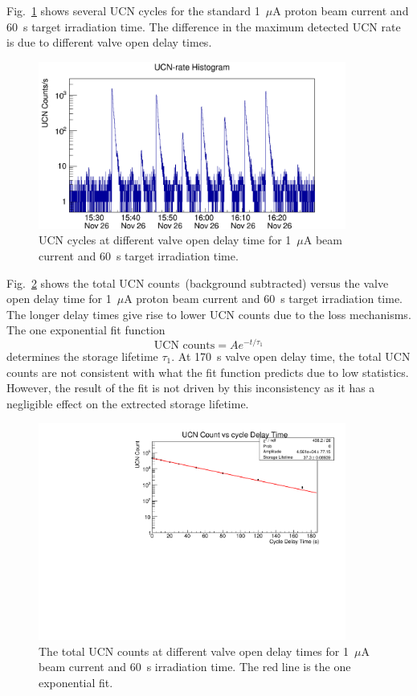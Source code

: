 Fig.~\ref{fig:storage_all} shows several UCN cycles for the standard
1~$\mu$A proton beam current and 60~s target irradiation time. The
difference in the maximum detected UCN rate is due to different valve
open delay times.
\begin{figure}[h!]
  \centering
  \includegraphics[width=0.9\textwidth]{storagetime_all.png}
  \caption{UCN cycles at different valve open delay time for 1~$\mu$A
    beam current and 60~s target irradiation time.}
  \label{fig:storage_all}
\end{figure}
Fig.~\ref{fig:storage_example} shows the total UCN counts~(background
subtracted) versus the valve open delay time for 1~$\mu$A proton beam
current and 60~s target irradiation time. The longer delay times give rise to
lower UCN counts due to the loss mechanisms. The one exponential fit
function
\begin{equation}
\text{UCN counts} = A e^{-t/\tau_1}
\end{equation}
determines the storage lifetime $\tau_1$. At 170~s valve open delay
time, the total UCN counts are not consistent with what the fit
function predicts due to low statistics. However, the result of the
fit is not driven by this inconsistency as it has a negligible effect
on the extrected storage lifetime.

\begin{figure}[h!]
  \centering
  \includegraphics[width=0.9\textwidth]{17002_StorageLifetime.pdf}
  \caption{The total UCN counts at different valve open delay times
    for 1~$\mu$A beam current and 60~s irradiation time. The red line
    is the one exponential fit. }
  \label{fig:storage_example}
\end{figure}

